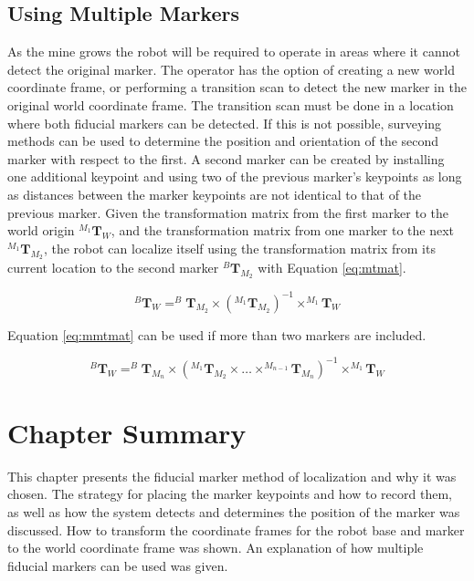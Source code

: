 \subsection{Using Multiple Markers}

As the mine grows the robot will be required to operate in areas where it cannot detect the original marker. The operator has the option of creating a new world coordinate frame, or performing a transition scan to detect the new marker in the original world coordinate frame. The transition scan must be done in a location where both fiducial markers can be detected. If this is not possible, surveying methods can be used to determine the position and orientation of the second marker with respect to the first. A second marker can be created by installing one additional keypoint and using two of the previous marker's keypoints as long as distances between the marker keypoints are not identical to that of the previous marker. Given the transformation matrix from the first marker to the world origin $^{M_1}\mathbf{T}_{W}$, and the transformation matrix from one marker to the next $^{M_1}\mathbf{T}_{M_2}$, the robot can localize itself using the transformation matrix from its current location to the second marker $^{B}\mathbf{T}_{M_2}$ with Equation \ref{eq:mtmat}.

\begin{equation}
\label{eq:mtmat}
    ^{B}\mathbf{T}_{W} = ^{B}\mathbf{T}_{M_2}\times(^{M_1}\mathbf{T}_{M_2})^{-1}\times^{M_1}\mathbf{T}_{W}
\end{equation}

Equation \ref{eq:mmtmat} can be used if more than two markers are included.

\begin{equation}
\label{eq:mmtmat}
    ^{B}\mathbf{T}_{W} = ^{B}\mathbf{T}_{M_n}\times(^{M_1}\mathbf{T}_{M_2}\times\hdots\times^{M_{n-1}}\mathbf{T}_{M_n})^{-1}\times^{M_1}\mathbf{T}_{W}
\end{equation}

\section{Chapter Summary}
This chapter presents the fiducial marker method of localization and why it was chosen. The strategy for placing the marker keypoints and how to record them, as well as how the system detects and determines the position of the marker was discussed. How to transform the coordinate frames for the robot base and marker to the world coordinate frame was shown. An explanation of how multiple fiducial markers can be used was given.